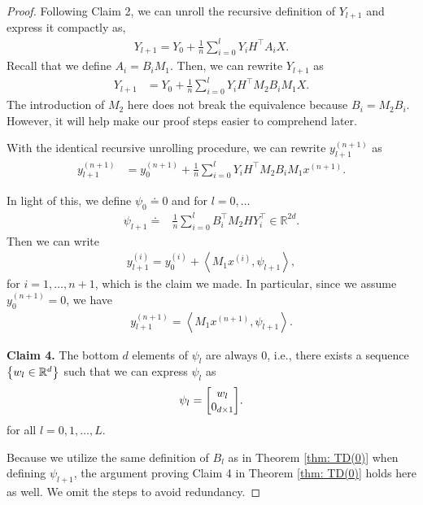 \documentclass{article}
\newcommand{\R}{\mathbb{R}}
\newcommand{\indot}[2]{{\left<#1, #2\right>}}
\begin{document}
\begin{proof}
    Following Claim 2, we can unroll the recursive definition of $Y_{l+1}$ and express it compactly as,
    \begin{align}
        Y_{l+1} = Y_0 + \frac{1}{n}\sum_{i=0}^l Y_i H^\top A_i X.
    \end{align}
    Recall that we define $A_i = B_i M_1$.
    Then, we can rewrite $Y_{l+1}$ as
    \begin{align}
        Y_{l+1} 
        &= Y_0 + \frac{1}{n} \sum_{i=0}^l Y_i H^\top M_2 B_i M_1 X.
    \end{align}
    The introduction of $M_2$ here does not break the equivalence because $B_i = M_2 B_i$.
    However, it will help make our proof steps easier to comprehend later.

    With the identical recursive unrolling procedure, we can rewrite $y_{l+1}^{(n+1)}$ as
    \begin{align}
        y_{l+1}^{(n+1)} &= y_0^{(n+1)} + \frac{1}{n} \sum_{i=0}^l Y_i H^\top M_2 B_i M_1 x^{(n+1)}.
    \end{align}
    
    
    In light of this,
    we define $\psi_0 \doteq 0$ and for $l = 0, \dots$
    \begin{align}
      \psi_{l+1} \doteq& \frac{1}{n}\sum_{i=0}^l B_i^\top M_2 H Y_i^\top \in \R^{2d}. \label{eq: lambda theta_l define}
    \end{align}
    Then we can write
    \begin{align}
        y_{l+1}^{(i)} = y_0^{(i)} + \indot{M_1 x^{(i)}}{\psi_{l+1}}, \label{eq: lambda y_l+1 evol theta}
    \end{align}
    for $i=1, \dots, n+1$, which is the claim we made.
    In particular, since we assume $y_0^{(n+1)} = 0$, we have
    \begin{align}
      y_{l+1}^{(n+1)} = \indot{M_1 x^{(n+1)}}{\psi_{l+1}}. 
    \end{align}
    
    
    \textbf{Claim 4.} The bottom $d$ elements of $\psi_l$ are always 0, i.e., there exists a sequence $\qty{w_l \in \R^d}$ such that we can express $\psi_l$ as
    \begin{align}
        \psi_l = \mqty[w_l \\ 0_{d \times 1}]. \label{eq: lambda theta_l sparsity}
    \end{align}
    for all $l = 0,1,\dots, L$.
    
    Because we utilize the same definition of $B_l$ as in Theorem \ref{thm: TD(0)} when defining $\psi_{l+1}$, the argument proving Claim 4 in Theorem \ref{thm: TD(0)} holds here as well. We omit the steps to avoid redundancy.


\end{proof}
\end{document}
